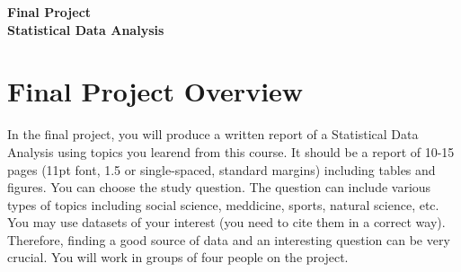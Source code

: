 \documentclass[12pt]{article}
\begin{document}
\begin{center}
\textbf{\Large Final Project \\ Statistical Data Analysis } 
\end{center}

	


\section*{Final Project Overview}
In the final project, you will produce a written report of a Statistical Data Analysis using topics you learend from this course. 
It should be a report of 10-15 pages (11pt font, 1.5 or single-spaced, standard margins) including tables and figures.
You can choose the study question. The question can include various types of topics including social science, meddicine, sports, natural science, etc. 
You may use datasets of your interest (you need to cite them in a correct way). 
Therefore, finding a good source of data and an interesting question can be very crucial. 
You will work in groups of four people on the project. 
\end{document}
